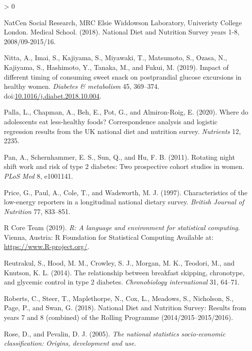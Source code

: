 \documentclass[utf8]{frontiersSCNS}
\newlength{\cslhangindent}
\newenvironment{CSLReferences}[2] %
 {%
  \setlength{\parindent}{0pt}
  \ifodd #1 \everypar{\setlength{\hangindent}{\cslhangindent}}\ignorespaces\fi
  \ifnum #2 > 0
  \setlength{\parskip}{#2\baselineskip}
  \fi
 }%
 {}
\begin{document}
\begin{CSLReferences}{1}{0}
\leavevmode\hypertarget{ref-NDNSdatabase2018}{}%
NatCen Social Research, MRC Elsie Widdowson Laboratory, Univeristy
College London. Medical School. (2018). National {D}iet and {N}utrition
{S}urvey years 1-8, 2008/09-2015/16.

\leavevmode\hypertarget{ref-Nitta2019}{}%
Nitta, A., Imai, S., Kajiyama, S., Miyawaki, T., Matsumoto, S., Ozasa,
N., Kajiyama, S., Hashimoto, Y., Tanaka, M., and Fukui, M. (2019).
Impact of different timing of consuming sweet snack on postprandial
glucose excursions in healthy women. \emph{Diabetes \& metabolism} 45,
369--374.
doi:\href{https://doi.org/10.1016/j.diabet.2018.10.004}{10.1016/j.diabet.2018.10.004}.

\leavevmode\hypertarget{ref-palla2020adolescents}{}%
Palla, L., Chapman, A., Beh, E., Pot, G., and Almiron-Roig, E. (2020).
Where do adolescents eat less-healthy foods? Correspondence analysis and
logistic regression results from the UK national diet and nutrition
survey. \emph{Nutrients} 12, 2235.

\leavevmode\hypertarget{ref-pan2011rotating}{}%
Pan, A., Schernhammer, E. S., Sun, Q., and Hu, F. B. (2011). Rotating
night shift work and risk of type 2 diabetes: Two prospective cohort
studies in women. \emph{PLoS Med} 8, e1001141.

\leavevmode\hypertarget{ref-price1997characteristics}{}%
Price, G., Paul, A., Cole, T., and Wadsworth, M. J. (1997).
Characteristics of the low-energy reporters in a longitudinal national
dietary survey. \emph{British Journal of Nutrition} 77, 833--851.

\leavevmode\hypertarget{ref-Rcoreteam}{}%
R Core Team (2019). \emph{R: A language and environment for statistical
computing}. Vienna, Austria: R Foundation for Statistical Computing
Available at: \url{https://www.R-project.org/}.

\leavevmode\hypertarget{ref-reutrakul2014relationship}{}%
Reutrakul, S., Hood, M. M., Crowley, S. J., Morgan, M. K., Teodori, M.,
and Knutson, K. L. (2014). The relationship between breakfast skipping,
chronotype, and glycemic control in type 2 diabetes. \emph{Chronobiology
international} 31, 64--71.

\leavevmode\hypertarget{ref-roberts2018national}{}%
Roberts, C., Steer, T., Maplethorpe, N., Cox, L., Meadows, S.,
Nicholson, S., Page, P., and Swan, G. (2018). National {D}iet and
{N}utrition {S}urvey: Results from years 7 and 8 (combined) of the
{R}olling {P}rogramme (2014/2015--2015/2016).

\leavevmode\hypertarget{ref-rose2005national}{}%
Rose, D., and Pevalin, D. J. (2005). \emph{The national statistics
socio-economic classification: Origins, development and use}.


\end{CSLReferences}
\end{document}
